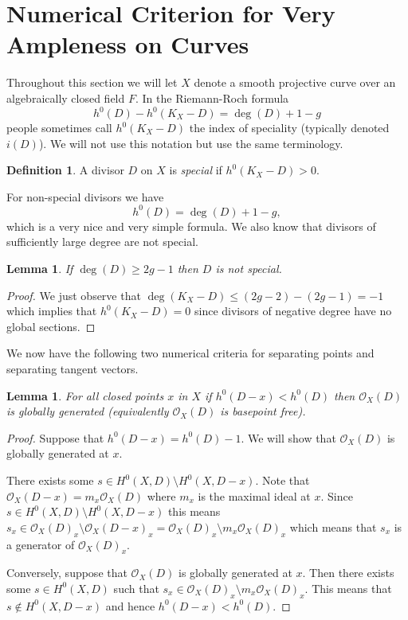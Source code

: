 \documentclass[12pt]{article}
\numberwithin{equation}{section}
\newtheorem{lemma}[theorem]{Lemma}
\theoremstyle{definition}
\newtheorem{definition}[theorem]{Definition}
\theoremstyle{remark}
\newcommand{\Ocal}{\mathcal{O}}
\begin{document}
\section{Numerical Criterion for Very Ampleness on Curves}

Throughout this section we will let $X$ denote a smooth projective curve over an algebraically closed field $F$.
In the Riemann-Roch formula
 $$ h^0(D) - h^0(K_X-D) =\deg(D) + 1-g $$
people sometimes call $h^0(K_X-D)$ the index of speciality (typically denoted $i(D)$).
We will not use this notation but use the same terminology.
\begin{definition}
	A divisor $D$ on $X$ is \emph{special} if $h^0(K_X-D)>0$. 
\end{definition}
For non-special divisors we have 
 $$ h^0(D) = \deg(D) + 1-g,$$
which is a very nice and very simple formula. 
We also know that divisors of sufficiently large degree are not special.
\begin{lemma}
	If $\deg(D)\geq 2g-1$ then $D$ is not special.
\end{lemma}
\begin{proof}
	We just observe that $\deg(K_X-D)\leq (2g-2)-(2g-1)= -1$ which implies that $h^0(K_X-D)=0$ since divisors of negative degree have no global sections.
\end{proof}
We now have the following two numerical criteria for separating points and separating tangent vectors. 
\begin{lemma}\label{lem:need}
For all closed points $x$ in $X$ if $h^0(D-x)<h^0(D)$ then $\Ocal_X(D)$ is globally generated (equivalently $\Ocal_X(D)$ is basepoint free).
\end{lemma}
\begin{proof}
Suppose that $h^0(D-x) = h^0(D)-1$. 
	We will show that $\Ocal_X(D)$ is globally generated at $x$.
	
	There exists some $s \in H^0(X,D)\setminus H^0(X,D-x)$.  
	Note that $\Ocal_X(D-x) = m_x\Ocal_X(D)$ where $m_x$ is the maximal ideal at $x$. 
	Since $s\in H^0(X,D)\setminus H^0(X,D-x)$ this means $s_x \in \Ocal_X(D)_x\setminus \Ocal_X(D-x)_x = \Ocal_X(D)_x \setminus m_x \Ocal_X(D)_x$ which means that $s_x$ is a generator of $\Ocal_X(D)_x$.
	
	Conversely, suppose that $\Ocal_X(D)$ is globally generated at $x$. 
	Then there exists some $s\in H^0(X,D)$ such that $s_x \in \Ocal_X(D)_x\setminus m_x\Ocal_X(D)_x$.
	This means that $s\notin H^0(X,D-x)$ and hence $h^0(D-x)<h^0(D)$.
\end{proof}
\end{document}

